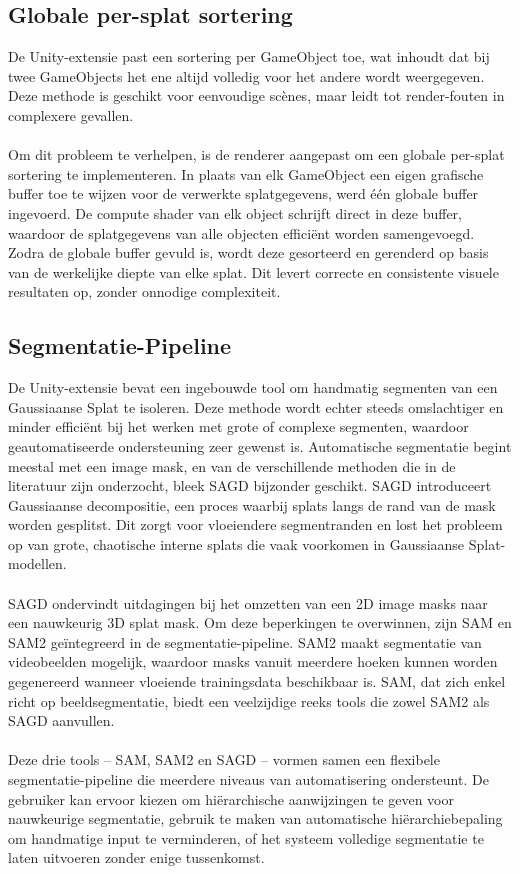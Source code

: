 \documentclass[twocolumn]{article}
\begin{document}
	\subsection{Globale per-splat sortering}
De Unity-extensie past een sortering per GameObject toe, wat inhoudt dat bij twee GameObjects het ene altijd volledig voor het andere wordt weergegeven. Deze methode is geschikt voor eenvoudige scènes, maar leidt tot render-fouten in complexere gevallen.
\\\\
Om dit probleem te verhelpen, is de renderer aangepast om een globale per-splat sortering te implementeren. In plaats van elk GameObject een eigen grafische buffer toe te wijzen voor de verwerkte splatgegevens, werd één globale buffer ingevoerd. De compute shader van elk object schrijft direct in deze buffer, waardoor de splatgegevens van alle objecten efficiënt worden samengevoegd. Zodra de globale buffer gevuld is, wordt deze gesorteerd en gerenderd op basis van de werkelijke diepte van elke splat. Dit levert correcte en consistente visuele resultaten op, zonder onnodige complexiteit.	
	\subsection{Segmentatie-Pipeline}
De Unity-extensie bevat een ingebouwde tool om handmatig segmenten van een Gaussiaanse Splat te isoleren. Deze methode wordt echter steeds omslachtiger en minder efficiënt bij het werken met grote of complexe segmenten, waardoor geautomatiseerde ondersteuning zeer gewenst is. Automatische segmentatie begint meestal met een image mask, en van de verschillende methoden die in de literatuur zijn onderzocht, bleek SAGD \cite{SAGD} bijzonder geschikt. SAGD introduceert Gaussiaanse decompositie, een proces waarbij splats langs de rand van de mask worden gesplitst. Dit zorgt voor vloeiendere segmentranden en lost het probleem op van grote, chaotische interne splats die vaak voorkomen in Gaussiaanse Splat-modellen.
\\\\
SAGD ondervindt uitdagingen bij het omzetten van een 2D image masks naar een nauwkeurig 3D splat mask. Om deze beperkingen te overwinnen, zijn SAM \cite{SAM} en SAM2 \cite{SAM2} geïntegreerd in de segmentatie-pipeline. SAM2 maakt segmentatie van videobeelden mogelijk, waardoor masks vanuit meerdere hoeken kunnen worden gegenereerd wanneer vloeiende trainingsdata beschikbaar is. SAM, dat zich enkel richt op beeldsegmentatie, biedt een veelzijdige reeks tools die zowel SAM2 als SAGD aanvullen.
\\\\
Deze drie tools – SAM, SAM2 en SAGD – vormen samen een flexibele segmentatie-pipeline die meerdere niveaus van automatisering ondersteunt. De gebruiker kan ervoor kiezen om hiërarchische aanwijzingen te geven voor nauwkeurige segmentatie, gebruik te maken van automatische hiërarchiebepaling om handmatige input te verminderen, of het systeem volledige segmentatie te laten uitvoeren zonder enige tussenkomst.
\end{document}

